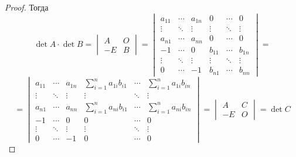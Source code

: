 \begin{proof}
Тогда
\begin{equation*}
\det A \cdot \det B =
\begin{vmatrix}
A & O \\
-E & B
\end{vmatrix} =
\begin{vmatrix}
a_{11} & \cdots & a_{1n} & 0 & \cdots & 0 \\
\vdots & \ddots & \vdots & \vdots & \ddots & \vdots \\
a_{n1} & \cdots & a_{nn} & 0 & \cdots & 0 \\
-1 & \cdots & 0 & b_{11} & \cdots & b_{1n} \\
\vdots & \ddots & \vdots & \vdots & \ddots & \vdots \\
0 & \cdots & -1 & b_{n1} & \cdots & b_{nn}
\end{vmatrix} =
\end{equation*}
\begin{equation*}
= \begin{vmatrix}
a_{11} & \cdots & a_{1n} & \sum\limits_{i=1}^n a_{1i} b_{i1} & \cdots & \sum\limits_{i=1}^n a_{1i} b_{in} \\
\vdots & \ddots & \vdots & \vdots & \ddots & \vdots \\
a_{n1} & \cdots & a_{nn} & \sum\limits_{i=1}^n a_{ni} b_{i1} & \cdots & \sum\limits_{i=1}^n a_{ni} b_{in} \\
-1 & \cdots & 0 & 0 & \cdots & 0 \\
\vdots & \ddots & \vdots & \vdots & \ddots & \vdots \\
0 & \cdots & -1 & 0 & \cdots & 0
\end{vmatrix} =
\begin{vmatrix}
A & C \\
-E & O
\end{vmatrix} =
\det C
\end{equation*}
\end{proof}